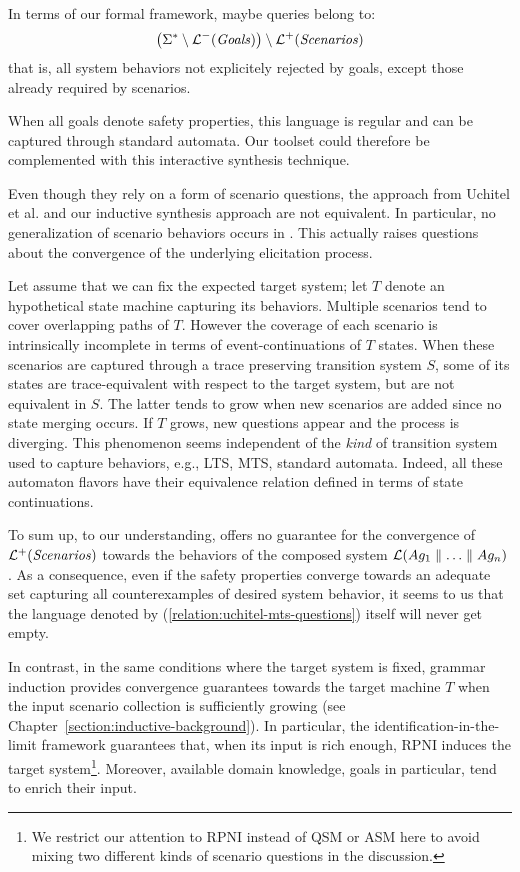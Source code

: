 In terms of our formal framework, maybe queries belong to:
\begin{align}
\left( \Sigma^* \setminus \mathcal{L}^-(\mbox{\emph{Goals}}) \right) \setminus \mathcal{L}^+(\mbox{\emph{Scenarios}})
\label{relation:uchitel-mts-questions}
\end{align}
that is, all system behaviors not explicitely rejected by goals, except those already required by scenarios.

When all goals denote safety properties, this language is regular and can be captured through standard automata. Our toolset could therefore be complemented with this interactive synthesis technique.

Even though they rely on a form of scenario questions, the approach from Uchitel et al. and our inductive synthesis approach are not equivalent. In particular, no generalization of scenario behaviors occurs in \cite{Uchitel:2007, Uchitel:2009}. This actually raises questions about the convergence of the underlying elicitation process. 

Let assume that we can fix the expected target system; let $T$ denote an hypothetical state machine capturing its behaviors. Multiple scenarios tend to cover overlapping paths of $T$. However the coverage of each scenario is intrinsically incomplete in terms of event-continuations of $T$ states. When these scenarios are captured through a trace preserving transition system $S$, some of its states are trace-equivalent with respect to the target system, but are not equivalent in $S$. The latter tends to grow when new scenarios are added since no state merging occurs. If $T$ grows, new questions appear and the process is diverging. This phenomenon seems independent of the \emph{kind} of transition system used to capture behaviors, e.g., LTS, MTS, standard automata. Indeed, all these automaton flavors have their equivalence relation defined in terms of state continuations.

To sum up, to our understanding, \cite{Uchitel:2009} offers no guarantee for the convergence of $\mathcal{L}^+(\mbox{\emph{Scenarios}})$ towards the behaviors of the composed system $\mathcal{L}(Ag_1 \parallel \ldots \parallel Ag_n)$. As a consequence, even if the safety properties converge towards an adequate set capturing all counterexamples of desired system behavior, it seems to us that the language denoted by (\ref{relation:uchitel-mts-questions}) itself will never get empty. 

In contrast, in the same conditions where the target system is fixed, grammar induction provides convergence guarantees towards the target machine $T$ when the input scenario collection is sufficiently growing \cite{Oncina:1993} (see Chapter~\ref{section:inductive-background}). In particular, the identification-in-the-limit framework guarantees that, when its input is rich enough, RPNI induces the target system\footnote{We restrict our attention to RPNI instead of QSM or ASM here to avoid mixing two different kinds of scenario questions in the discussion.}. Moreover, available domain knowledge, goals in particular, tend to enrich their input.

